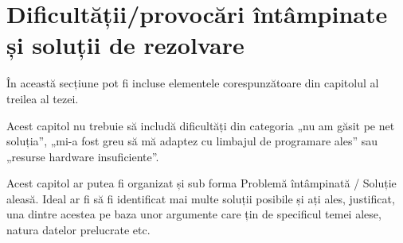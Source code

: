 \documentclass[12pt]{report}
\begin{document}
\section*{Dificultății/provocări întâmpinate și soluții de rezolvare}

În această secțiune pot fi incluse elementele corespunzătoare din capitolul al treilea al tezei.

Acest capitol nu trebuie să includă dificultăți din categoria „nu am găsit pe net soluția”, „mi-a fost greu să mă adaptez cu limbajul de programare ales” sau „resurse hardware insuficiente”.

Acest capitol ar putea fi organizat și sub forma Problemă întâmpinată / Soluție aleasă.
Ideal ar fi să fi identificat mai multe soluții posibile și ați ales, justificat, una dintre acestea pe baza unor argumente care țin de specificul temei alese, natura datelor prelucrate etc.

\nopagebreak


\end{document}
